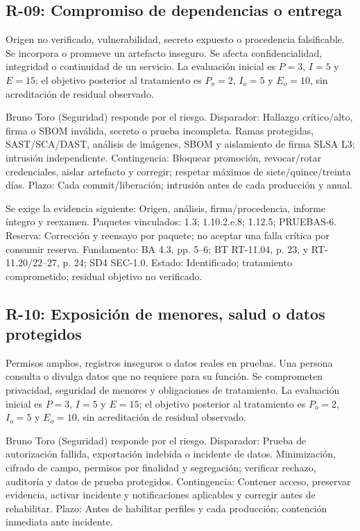 \subsection{R-09: Compromiso de dependencias o entrega}
Origen no verificado, vulnerabilidad, secreto expuesto o procedencia falsificable. Se incorpora o promueve un artefacto inseguro. Se afecta confidencialidad, integridad o continuidad de un servicio. La evaluación inicial es $P=3$, $I=5$ y $E=15$; el objetivo posterior al tratamiento es $P_o=2$, $I_o=5$ y $E_o=10$, sin acreditación de residual observado.

Bruno Toro (Seguridad) responde por el riesgo. Disparador: Hallazgo crítico/alto, firma o SBOM inválida, secreto o prueba incompleta. Ramas protegidas, SAST/SCA/DAST, análisis de imágenes, SBOM y aislamiento de firma SLSA L3; intrusión independiente. Contingencia: Bloquear promoción, revocar/rotar credenciales, aislar artefacto y corregir; respetar máximos de siete/quince/treinta días. Plazo: Cada commit/liberación; intrusión antes de cada producción y anual.

Se exige la evidencia siguiente: Origen, análisis, firma/procedencia, informe íntegro y reexamen. Paquetes vinculados: 1.3; 1.10.2.e.8; 1.12.5; PRUEBAS-6. Reserva: Corrección y reensayo por paquete; no aceptar una falla crítica por consumir reserva. Fundamento: BA 4.3, pp. 5–6; BT RT-11.04, p. 23, y RT-11.20/22–27, p. 24; SD4 SEC-1.0. Estado: Identificado; tratamiento comprometido; residual objetivo no verificado. \parencites[art.~4.3, pp.~5--6]{sd8-ba}[RT-11.04, p.~23; RT-11.20/22--27, p.~24]{sd8-bt}

\subsection{R-10: Exposición de menores, salud o datos protegidos}
Permisos amplios, registros inseguros o datos reales en pruebas. Una persona consulta o divulga datos que no requiere para su función. Se comprometen privacidad, seguridad de menores y obligaciones de tratamiento. La evaluación inicial es $P=3$, $I=5$ y $E=15$; el objetivo posterior al tratamiento es $P_o=2$, $I_o=5$ y $E_o=10$, sin acreditación de residual observado.

Bruno Toro (Seguridad) responde por el riesgo. Disparador: Prueba de autorización fallida, exportación indebida o incidente de datos. Minimización, cifrado de campo, permisos por finalidad y segregación; verificar rechazo, auditoría y datos de prueba protegidos. Contingencia: Contener acceso, preservar evidencia, activar incidente y notificaciones aplicables y corregir antes de rehabilitar. Plazo: Antes de habilitar perfiles y cada producción; contención inmediata ante incidente.

